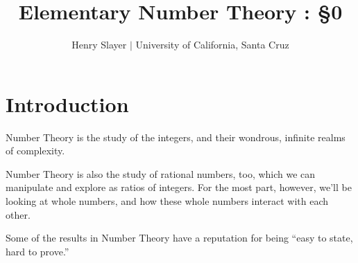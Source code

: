 \documentclass{article}
\begin{document}
 

\title{Elementary Number Theory : \S0} 
\author{Henry Slayer $|$ University of California, Santa Cruz} 
\date{}
\maketitle

\section*{Introduction}
Number Theory is the study of the integers, and their wondrous, infinite realms of complexity.

Number Theory is also the study of rational numbers, too, which we can manipulate and explore as ratios of integers. For the most part, however, we'll be looking at whole numbers, and how these whole numbers interact with each other.

Some of the results in Number Theory have a reputation for being “easy to state, hard to prove.”
 
\end{document}
